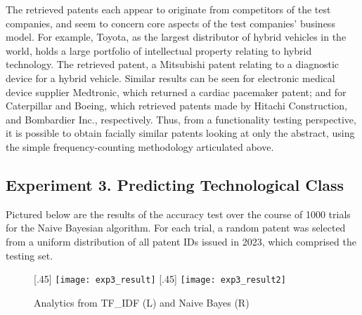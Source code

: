 \documentclass{article}
\begin{document}
The retrieved patents each appear to originate from competitors of the test companies, and seem to concern core aspects of the test companies’ business model.  For example, Toyota, as the largest distributor of hybrid vehicles in the world, holds a large portfolio of intellectual property relating to hybrid technology.  The retrieved patent, a Mitsubishi patent relating to a diagnostic device for a hybrid vehicle.  Similar results can be seen for electronic medical device supplier Medtronic, which returned a cardiac pacemaker patent; and for Caterpillar and Boeing, which retrieved patents made by Hitachi Construction, and Bombardier Inc., respectively.  Thus, from a functionality testing perspective, it is possible to obtain facially similar patents looking at only the abstract, using the simple frequency-counting methodology articulated above.

\subsection{Experiment 3. Predicting Technological Class}
Pictured below are the results of the accuracy test over the course of 1000 trials for the Naive Bayesian algorithm.  For each trial, a random patent was selected from a uniform distribution of all patent IDs issued in 2023, which comprised the testing set.

\begin{figure}[ht]
  [.45\linewidth]{%
    \texttt{[image: exp3\_result]}%
  }%
  \hfill
  [.45\linewidth]{%
    \texttt{[image: exp3\_result2]}%
  }
  \caption{Analytics from TF\_IDF (L) and Naive Bayes (R)}
  \label{fig:exp3_result}
\end{figure}
\end{document}
